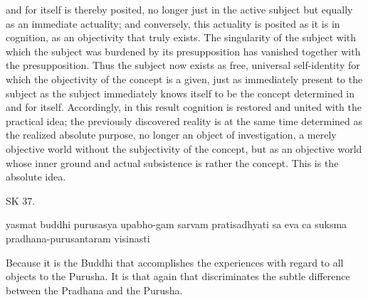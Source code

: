 and for itself is thereby posited, no longer just in the active subject but
equally as an immediate actuality; and conversely, this actuality is posited
as it is in cognition, as an objectivity that truly exists. The singularity of
the subject with which the subject was burdened by its presupposition has
vanished together with the presupposition. Thus the subject now exists
as free, universal self-identity for which the objectivity of the concept is a
given, just as immediately present to the subject as the subject immediately
knows itself to be the concept determined in and for itself. Accordingly,
in this result cognition is restored and united with the practical idea; the
previously discovered reality is at the same time determined as the realized
absolute purpose, no longer an object of investigation, a merely objective
world without the subjectivity of the concept, but as an objective world
whose inner ground and actual subsistence is rather the concept. This is
the absolute idea.

SK 37.

yasmat buddhi purusasya upabho-gam sarvam pratisadhyati
sa eva ca suksma pradhana-purusantaram visinasti

Because it is the Buddhi that accomplishes the experiences
with regard to all objects to the Purusha.
It is that again that discriminates the subtle difference
between the Pradhana and the Purusha.

